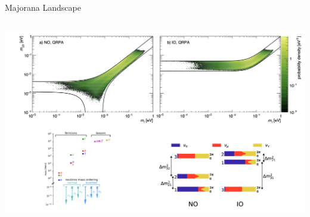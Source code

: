 \documentclass [aspectratio=169]{beamer}
\begin{document}



\begin{frame}{Majorana Landscape}

\begin{columns}
\includegraphics[scale=0.25]{landscape2.png}



%
\end{columns}

\end{frame}
\end{document}
